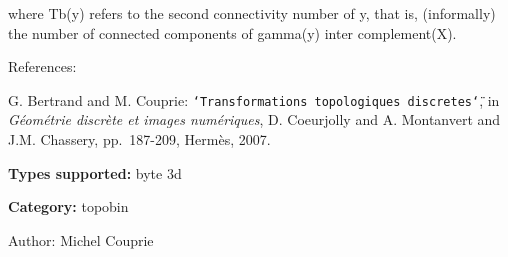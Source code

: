 where Tb(y) refers to the second connectivity number of y, that is, (informally) the number of connected components of gamma(y) inter complement(X).

References:\par
 [BC07] G. Bertrand and M. Couprie: {\tt \char`\"{}Transformations topologiques discretes\char`\"{}}, in {\em G\'{e}om\'{e}trie discr\`{e}te et images num\'{e}riques\/}, D. Coeurjolly and A. Montanvert and J.M. Chassery, pp.~187-209, Herm\`{e}s, 2007.\par


{\bf Types supported:} byte 3d

{\bf Category:} topobin

\begin{Desc}
\item[Author:]Michel Couprie \end{Desc}
